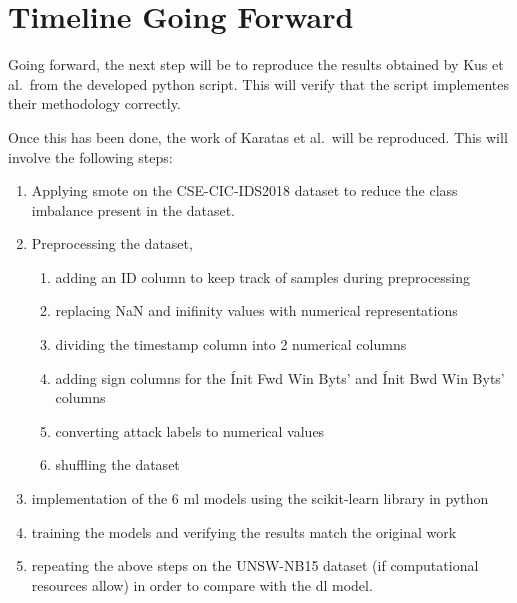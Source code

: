 \chapter{Timeline Going Forward}%
\label{chp:timeline}

Going forward, the next step will be to reproduce the results obtained by Kus
et al.\ from the developed python script. This will verify that the script
implementes their methodology correctly.

Once this has been done, the work of Karatas et al.\ will be reproduced. This
will involve the following steps:
\begin{enumerate}
    \item Applying \gls{smote} on the CSE-CIC-IDS2018 dataset to reduce the class
          imbalance present in the dataset.
    \item Preprocessing the dataset,
          \begin{enumerate}
              \item adding an ID column to keep track of samples during preprocessing
              \item replacing NaN and inifinity values with numerical representations
              \item dividing the timestamp column into 2 numerical columns
              \item adding sign columns for the \'Init Fwd Win Byts' and \'Init Bwd Win Byts'
                    columns
              \item converting attack labels to numerical values
              \item shuffling the dataset
          \end{enumerate}
    \item implementation of the 6 \gls{ml} models using the scikit-learn library in
          python
    \item training the models and verifying the results match the original work
    \item repeating the above steps on the UNSW-NB15 dataset (if computational resources
          allow) in order to compare with the \gls{dl} model.
\end{enumerate}

